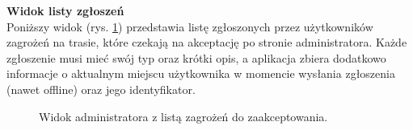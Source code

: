 \noindent
\textbf{Widok listy zgłoszeń}\\
\indent Poniższy widok (rys. \ref{widok:adminaccept}) przedstawia listę zgłoszonych przez użytkowników zagrożeń na trasie, które czekają na akceptację po stronie administratora. Każde zgłoszenie musi mieć swój typ oraz krótki opis, a aplikacja zbiera dodatkowo informacje o aktualnym miejscu użytkownika w momencie wysłania zgłoszenia (nawet offline) oraz jego identyfikator.
\begin{figure}[H]
    \centering
    \caption{Widok administratora z listą zagrożeń do zaakceptowania.}
    \label{widok:adminaccept}
\end{figure}

